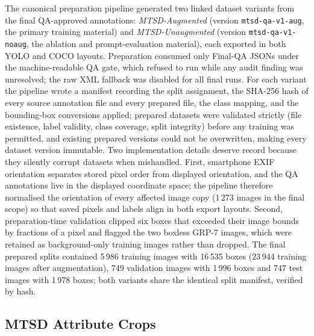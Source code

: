 The canonical preparation pipeline generated two linked dataset variants from the final QA-approved annotations: \emph{MTSD-Augmented} (version \texttt{mtsd-qa-v1-aug}, the primary training material) and \emph{MTSD-Unaugmented} (version \texttt{mtsd-qa-v1-noaug}, the ablation and prompt-evaluation material), each exported in both YOLO and COCO layouts. Preparation consumed only Final-QA JSONs under the machine-readable QA gate, which refused to run while any audit finding was unresolved; the raw XML fallback was disabled for all final runs. For each variant the pipeline wrote a manifest recording the split assignment, the SHA-256 hash of every source annotation file and every prepared file, the class mapping, and the bounding-box conversions applied; prepared datasets were validated strictly (file existence, label validity, class coverage, split integrity) before any training was permitted, and existing prepared versions could not be overwritten, making every dataset version immutable. Two implementation details deserve record because they silently corrupt datasets when mishandled. First, smartphone EXIF orientation separates stored pixel order from displayed orientation, and the QA annotations live in the displayed coordinate space; the pipeline therefore normalised the orientation of every affected image copy (1\,273 images in the final scope) so that saved pixels and labels align in both export layouts. Second, preparation-time validation clipped six boxes that exceeded their image bounds by fractions of a pixel and flagged the two boxless GRP-7 images, which were retained as background-only training images rather than dropped. The final prepared splits contained 5\,986 training images with 16\,535 boxes (23\,944 training images after augmentation), 749 validation images with 1\,996 boxes and 747 test images with 1\,978 boxes; both variants share the identical split manifest, verified by hash.

\subsection{MTSD Attribute Crops}

